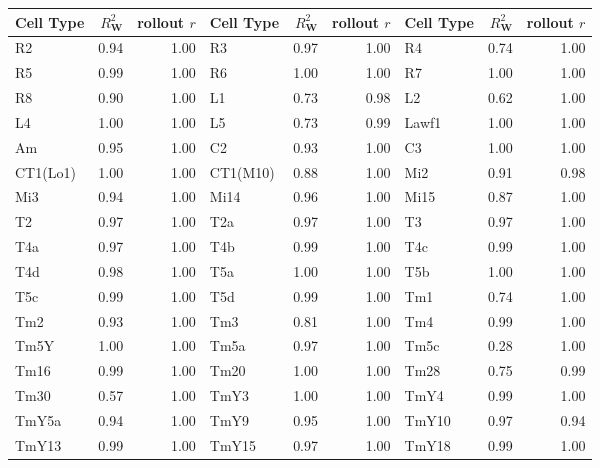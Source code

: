 \begin{tabular}{lrr@{\quad}lrr@{\quad}lrr}
\toprule
Cell Type & $R^2_{\mathbf{W}}$ & rollout $r$ &Cell Type & $R^2_{\mathbf{W}}$ & rollout $r$ & Cell Type & $R^2_{\mathbf{W}}$ & rollout $r$ \\
\midrule
R2         & 0.94 & 1.00 & R3         & 0.97 & 1.00 & R4         & 0.74 & 1.00 \\
R5         & 0.99 & 1.00 & R6         & 1.00 & 1.00 & R7         & 1.00 & 1.00 \\
R8         & 0.90 & 1.00 & L1         & 0.73 & 0.98 & L2         & 0.62 & 1.00 \\
L4         & 1.00 & 1.00 & L5         & 0.73 & 0.99 & Lawf1      & 1.00 & 1.00 \\
Am         & 0.95 & 1.00 & C2         & 0.93 & 1.00 & C3         & 1.00 & 1.00 \\
CT1(Lo1)   & 1.00 & 1.00 & CT1(M10)   & 0.88 & 1.00 & Mi2        & 0.91 & 0.98 \\
Mi3        & 0.94 & 1.00 & Mi14       & 0.96 & 1.00 & Mi15       & 0.87 & 1.00 \\
T2         & 0.97 & 1.00 & T2a        & 0.97 & 1.00 & T3         & 0.97 & 1.00 \\
T4a        & 0.97 & 1.00 & T4b        & 0.99 & 1.00 & T4c        & 0.99 & 1.00 \\
T4d        & 0.98 & 1.00 & T5a        & 1.00 & 1.00 & T5b        & 1.00 & 1.00 \\
T5c        & 0.99 & 1.00 & T5d        & 0.99 & 1.00 & Tm1        & 0.74 & 1.00 \\
Tm2        & 0.93 & 1.00 & Tm3        & 0.81 & 1.00 & Tm4        & 0.99 & 1.00 \\
Tm5Y       & 1.00 & 1.00 & Tm5a       & 0.97 & 1.00 & Tm5c       & 0.28 & 1.00 \\
Tm16       & 0.99 & 1.00 & Tm20       & 1.00 & 1.00 & Tm28       & 0.75 & 0.99 \\
Tm30       & 0.57 & 1.00 & TmY3       & 1.00 & 1.00 & TmY4       & 0.99 & 1.00 \\
TmY5a      & 0.94 & 1.00 & TmY9       & 0.95 & 1.00 & TmY10      & 0.97 & 0.94 \\
TmY13      & 0.99 & 1.00 & TmY15      & 0.97 & 1.00 & TmY18      & 0.99 & 1.00 \\
\bottomrule
\end{tabular}
